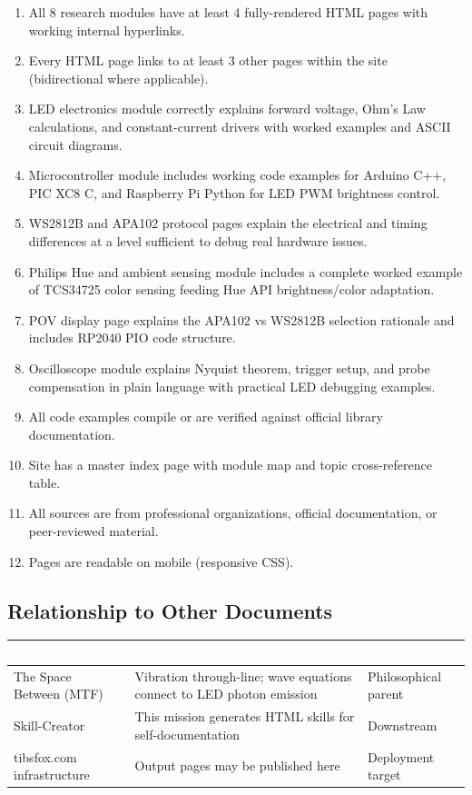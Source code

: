 \documentclass[11pt,letterpaper]{article}
\newcommand{\tableheader}[1]{\textbf{\sffamily\textcolor{white}{#1}}}
\begin{document}
\begin{enumerate}
  \item All 8 research modules have at least 4 fully-rendered HTML pages with working internal hyperlinks.
  \item Every HTML page links to at least 3 other pages within the site (bidirectional where applicable).
  \item LED electronics module correctly explains forward voltage, Ohm's Law calculations, and constant-current drivers with worked examples and ASCII circuit diagrams.
  \item Microcontroller module includes working code examples for Arduino C++, PIC XC8 C, and Raspberry Pi Python for LED PWM brightness control.
  \item WS2812B and APA102 protocol pages explain the electrical and timing differences at a level sufficient to debug real hardware issues.
  \item Philips Hue and ambient sensing module includes a complete worked example of TCS34725 color sensing feeding Hue API brightness/color adaptation.
  \item POV display page explains the APA102 vs WS2812B selection rationale and includes RP2040 PIO code structure.
  \item Oscilloscope module explains Nyquist theorem, trigger setup, and probe compensation in plain language with practical LED debugging examples.
  \item All code examples compile or are verified against official library documentation.
  \item Site has a master index page with module map and topic cross-reference table.
  \item All sources are from professional organizations, official documentation, or peer-reviewed material.
  \item Pages are readable on mobile (responsive CSS).
\end{enumerate}

\subsection{Relationship to Other Documents}

\begin{center}
\begin{tabularx}{\textwidth}{L{4cm}XL{3cm}}
\toprule
{}
\tableheader{Document} & \tableheader{Relationship} & \tableheader{Direction} \\
\midrule
The Space Between (MTF) & Vibration through-line; wave equations connect to LED photon emission & Philosophical parent \\
Skill-Creator & This mission generates HTML skills for self-documentation & Downstream \\
tibsfox.com infrastructure & Output pages may be published here & Deployment target \\
\bottomrule
\end{tabularx}
\end{center}
\end{document}
